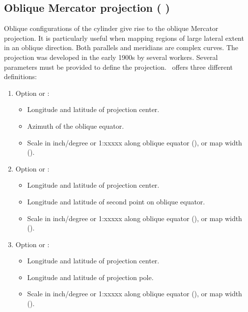 
\subsection{Oblique Mercator projection ( )}

Oblique configurations of the cylinder give rise to the
oblique Mercator projection.  It is particularly useful when
mapping regions of large lateral extent in an oblique direction.
Both parallels and meridians are complex curves.  The projection
was developed in the early 1900s by several workers.  Several
parameters must be provided to define the projection.
\GMT\ offers three different definitions:

\begin{enumerate}
\item Option  or : 
\begin{itemize} 
\item Longitude and latitude of projection center.
\item Azimuth of the oblique equator.
\item Scale in inch/degree or 1:xxxxx along oblique equator (), or map width ().
\end{itemize} 

\item Option  or :
\begin{itemize} 
\item Longitude and latitude of projection center.
\item Longitude and latitude of second point on oblique equator.
\item Scale in inch/degree or 1:xxxxx along oblique equator (), or map width ().
\end{itemize} 

\item Option  or :
\begin{itemize} 
\item Longitude and latitude of projection center.
\item Longitude and latitude of projection pole.
\item Scale in inch/degree or 1:xxxxx along oblique equator (), or map width ().
\end{itemize}

\end{enumerate}


